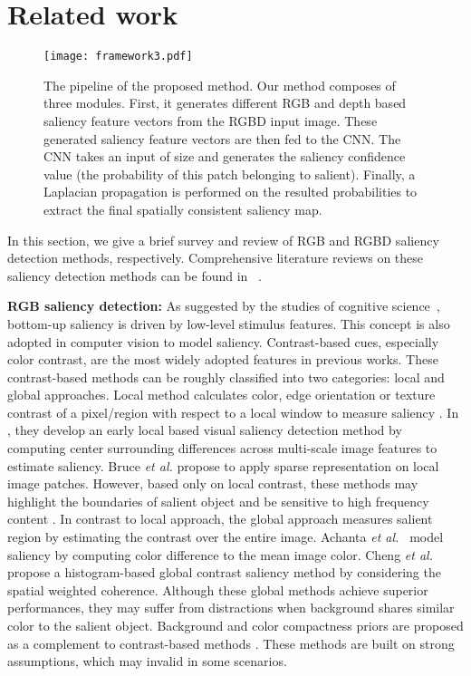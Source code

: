 \documentclass[journal]{IEEEtran}
\newcommand{\etal}{\textit{et al.~}}
\begin{document}
\section{Related work}
\begin{figure*}
\centering
\texttt{[image: framework3.pdf]}
\vspace{-1.0mm}
   \caption{The pipeline of the proposed method. Our method composes of three modules. First, it generates different RGB and depth based saliency feature vectors from the RGBD input image. These generated saliency feature vectors are then fed to the CNN. The CNN takes an input of size  and generates the saliency confidence value (the probability of this patch belonging to salient). Finally, a Laplacian propagation is performed on the resulted probabilities to extract the final spatially consistent saliency map.
  }
\label{fig:Convnet}
\vspace{-1.5mm}
\end{figure*}

In this section, we give a brief survey and review of RGB and RGBD saliency detection methods, respectively. Comprehensive literature reviews on these saliency detection
methods can be found in ~\cite{borji2014salient,peng2014rgbd}.

\textbf{RGB saliency detection:} As suggested by the studies of cognitive science~\cite{itti1998model}, bottom-up saliency is driven by low-level stimulus features. This concept is also adopted in computer vision to model saliency. Contrast-based cues, especially color contrast, are the most widely adopted features in previous works. These contrast-based methods can be roughly classified into two categories: local and global approaches. Local method calculates color, edge orientation or texture contrast of a pixel/region with respect to a local window to measure saliency \cite{itti1998model,bruce2005saliency}. In \cite{itti1998model}, they develop an early local based visual saliency detection method by computing center surrounding differences across multi-scale image features to estimate saliency. Bruce \emph{et al.} \cite{bruce2005saliency} propose to apply sparse representation on local image patches. However, based only on local contrast, these methods may highlight the boundaries of salient object \cite{keyang2013} and be sensitive to high frequency content \cite{shenfeng2014}. In contrast to local approach, the global approach measures salient region by estimating the contrast over the entire image. Achanta \etal \cite{achanta2009frequency} model saliency by computing color difference to the mean image color. Cheng \etal \cite{ChengPAMI} propose a histogram-based global contrast saliency method by considering the spatial weighted coherence. Although these global methods achieve superior performances, they may suffer from distractions when background shares similar color to the salient object. Background and color compactness priors are proposed as a complement to contrast-based methods \cite{wei2012geodesic,shen2012unified,keyang2013}. These methods are built on strong assumptions, which may invalid in some scenarios.
\end{document}
